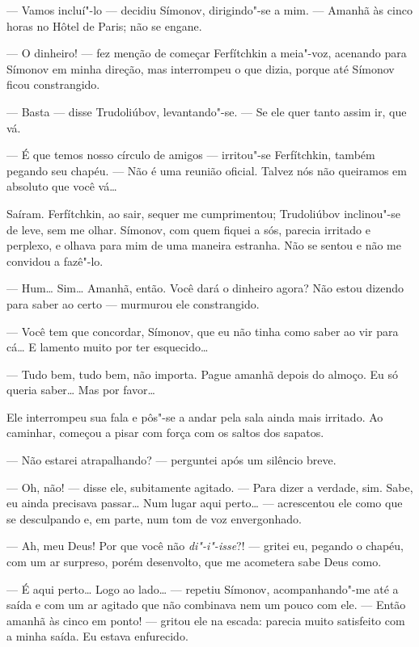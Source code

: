 --- Vamos incluí"-lo --- decidiu Símonov, dirigindo"-se a mim. --- Amanhã às
cinco horas no Hôtel de Paris; não se engane.

--- O dinheiro! --- fez menção de começar Ferfítchkin a meia"-voz, acenando
para Símonov em minha direção, mas interrompeu o que dizia, porque até
Símonov ficou constrangido.

--- Basta --- disse Trudoliúbov, levantando"-se. --- Se ele quer tanto assim
ir, que vá.

--- É que temos nosso círculo de amigos --- irritou"-se Ferfítchkin, também
pegando seu chapéu. --- Não é uma reunião oficial. Talvez nós não
queiramos em absoluto que você vá\ldots{}

Saíram. Ferfítchkin, ao sair, sequer me cumprimentou; Trudoliúbov
inclinou"-se de leve, sem me olhar. Símonov, com quem fiquei a sós,
parecia irritado e perplexo, e olhava para mim de uma maneira estranha.
Não se sentou e não me convidou a fazê"-lo.

--- Hum\ldots{} Sim\ldots{} Amanhã, então. Você dará o dinheiro agora? Não estou
dizendo para saber ao certo --- murmurou ele constrangido.


--- Você tem que concordar, Símonov, que eu não tinha como saber ao vir
para cá\ldots{} E lamento muito por ter esquecido\ldots{}

--- Tudo bem, tudo bem, não importa. Pague amanhã depois do almoço. Eu só
queria saber\ldots{} Mas por favor\ldots{}

Ele interrompeu sua fala e pôs"-se a andar pela sala ainda mais irritado.
Ao caminhar, começou a pisar com força com os saltos dos sapatos.

--- Não estarei atrapalhando? --- perguntei após um silêncio breve.

--- Oh, não! --- disse ele, subitamente agitado. --- Para dizer a verdade,
sim. Sabe, eu ainda precisava passar\ldots{} Num lugar aqui perto\ldots{} ---
acrescentou ele como que se desculpando e, em parte, num tom de voz
envergonhado.

--- Ah, meu Deus! Por que você não \textit{di"-i"-isse}?! --- gritei eu, pegando o
chapéu, com um ar surpreso, porém desenvolto, que me acometera sabe Deus
como.

--- É aqui perto\ldots{} Logo ao lado\ldots{} --- repetiu Símonov, acompanhando"-me até
a saída e com um ar agitado que não combinava nem um pouco com ele. ---
Então amanhã às cinco em ponto! --- gritou ele na escada: parecia muito
satisfeito com a minha saída. Eu estava enfurecido.

